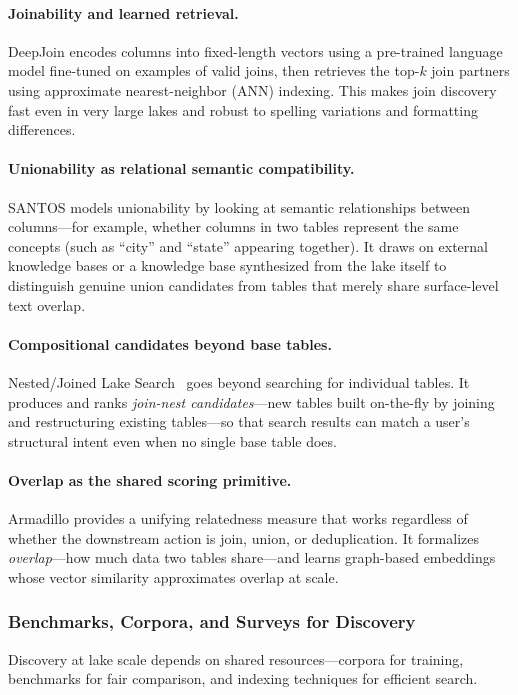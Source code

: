 \documentclass[sigconf]{acmart}
\begin{document}
\paragraph{Joinability and learned retrieval.}
DeepJoin encodes columns into fixed-length vectors using a pre-trained language model fine-tuned on examples of valid joins, then retrieves the top-$k$ join partners using approximate nearest-neighbor (ANN) indexing. This makes join discovery fast even in very large lakes and robust to spelling variations and formatting differences.

\paragraph{Unionability as relational semantic compatibility.}
SANTOS models unionability by looking at semantic relationships between columns---for example, whether columns in two tables represent the same concepts (such as ``city'' and ``state'' appearing together). It draws on external knowledge bases or a knowledge base synthesized from the lake itself to distinguish genuine union candidates from tables that merely share surface-level text overlap.

\paragraph{Compositional candidates beyond base tables.}
Nested/Joined Lake Search~\cite{10.14778/3681954.3682005} goes beyond searching for individual tables. It produces and ranks \emph{join-nest candidates}---new tables built on-the-fly by joining and restructuring existing tables---so that search results can match a user's structural intent even when no single base table does.

\paragraph{Overlap as the shared scoring primitive.}
Armadillo provides a unifying relatedness measure that works regardless of whether the downstream action is join, union, or deduplication. It formalizes \emph{overlap}---how much data two tables share---and learns graph-based embeddings whose vector similarity approximates overlap at scale.

\subsubsection{Benchmarks, Corpora, and Surveys for Discovery}
Discovery at lake scale depends on shared resources---corpora for training, benchmarks for fair comparison, and indexing techniques for efficient search.
\end{document}
